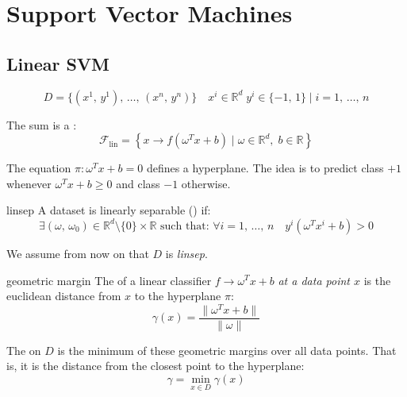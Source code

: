 \chapter[SVMs]{Support Vector Machines}

\section{Linear SVM}
\label{sec:linear-svm}

\begin{equation*}
	D = \{ (x^1,\, y^1),\, \dots,\, (x^n,\, y^n) \} \quad  x^i \in \mathds{R}^d \; y^i \in \{-1,\, 1\} \mid i = 1,\, \dots,\, n
\end{equation*}

The sum is a :
\begin{equation}
	\mathcal{F}_{\text{lin}} = \left\{
    x \to f\left(\omega^Tx + b\right) \mid
    \omega \in \mathds{R}^d,
    \; b \in \mathds{R}
  \right\}
\end{equation}

The equation $\pi : \omega^Tx + b = 0$ defines a hyperplane.
The idea is to predict class $+1$ whenever $\omega^Tx + b \geq 0$ and class $-1$ otherwise.

\begin{definition}{linsep}{}
	A dataset is linearly separable () if:
	\begin{equation*}
		\exists (\omega,\, \omega_0) \in \mathds{R}^d \setminus \{0\} \times \mathds{R}
		\text{ such that: }
		\forall i=1,\,\dots,\,n\quad y^i(\omega^Tx^i +b) > 0
	\end{equation*}
\end{definition}

We assume from now on that $D$ is \emph{linsep}.

\begin{definition}{geometric margin}{}
	The  of a linear
  classifier $f \to \omega^Tx + b$ \emph{at a data point $x$} is the
	euclidean distance from $x$ to the hyperplane $\pi$:
	\begin{equation*}
		\gamma(x) = \frac{\lVert\omega^Tx + b\rVert}{\lVert\omega\rVert} \tag{geometric margin at $x$}
	\end{equation*}

  \tcbline

  The  on $D$ is the minimum of
these geometric margins over all data points. That is, it is the distance
from the closest point to the hyperplane:
\begin{equation*}
	\gamma = \min_{x \in D} \gamma(x) \tag{geometric margin of a linear classifier}
\end{equation*}

\end{definition}

